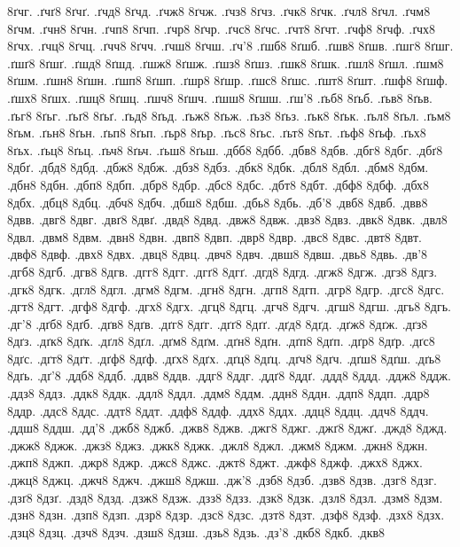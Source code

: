 {8ґчг.
.ґчґ8
8ґчґ.
.ґчд8
8ґчд.
.ґчж8
8ґчж.
.ґчз8
8ґчз.
.ґчк8
8ґчк.
.ґчл8
8ґчл.
.ґчм8
8ґчм.
.ґчн8
8ґчн.
.ґчп8
8ґчп.
.ґчр8
8ґчр.
.ґчс8
8ґчс.
.ґчт8
8ґчт.
.ґчф8
8ґчф.
.ґчх8
8ґчх.
.ґчц8
8ґчц.
.ґчч8
8ґчч.
.ґчш8
8ґчш.
.ґч'8
.ґшб8
8ґшб.
.ґшв8
8ґшв.
.ґшг8
8ґшг.
.ґшґ8
8ґшґ.
.ґшд8
8ґшд.
.ґшж8
8ґшж.
.ґшз8
8ґшз.
.ґшк8
8ґшк.
.ґшл8
8ґшл.
.ґшм8
8ґшм.
.ґшн8
8ґшн.
.ґшп8
8ґшп.
.ґшр8
8ґшр.
.ґшс8
8ґшс.
.ґшт8
8ґшт.
.ґшф8
8ґшф.
.ґшх8
8ґшх.
.ґшц8
8ґшц.
.ґшч8
8ґшч.
.ґшш8
8ґшш.
.ґш'8
.ґьб8
8ґьб.
.ґьв8
8ґьв.
.ґьг8
8ґьг.
.ґьґ8
8ґьґ.
.ґьд8
8ґьд.
.ґьж8
8ґьж.
.ґьз8
8ґьз.
.ґьк8
8ґьк.
.ґьл8
8ґьл.
.ґьм8
8ґьм.
.ґьн8
8ґьн.
.ґьп8
8ґьп.
.ґьр8
8ґьр.
.ґьс8
8ґьс.
.ґьт8
8ґьт.
.ґьф8
8ґьф.
.ґьх8
8ґьх.
.ґьц8
8ґьц.
.ґьч8
8ґьч.
.ґьш8
8ґьш.
.дбб8
8дбб.
.дбв8
8дбв.
.дбг8
8дбг.
.дбґ8
8дбґ.
.дбд8
8дбд.
.дбж8
8дбж.
.дбз8
8дбз.
.дбк8
8дбк.
.дбл8
8дбл.
.дбм8
8дбм.
.дбн8
8дбн.
.дбп8
8дбп.
.дбр8
8дбр.
.дбс8
8дбс.
.дбт8
8дбт.
.дбф8
8дбф.
.дбх8
8дбх.
.дбц8
8дбц.
.дбч8
8дбч.
.дбш8
8дбш.
.дбь8
8дбь.
.дб'8
.двб8
8двб.
.двв8
8двв.
.двг8
8двг.
.двґ8
8двґ.
.двд8
8двд.
.двж8
8двж.
.двз8
8двз.
.двк8
8двк.
.двл8
8двл.
.двм8
8двм.
.двн8
8двн.
.двп8
8двп.
.двр8
8двр.
.двс8
8двс.
.двт8
8двт.
.двф8
8двф.
.двх8
8двх.
.двц8
8двц.
.двч8
8двч.
.двш8
8двш.
.двь8
8двь.
.дв'8
.дгб8
8дгб.
.дгв8
8дгв.
.дгг8
8дгг.
.дгґ8
8дгґ.
.дгд8
8дгд.
.дгж8
8дгж.
.дгз8
8дгз.
.дгк8
8дгк.
.дгл8
8дгл.
.дгм8
8дгм.
.дгн8
8дгн.
.дгп8
8дгп.
.дгр8
8дгр.
.дгс8
8дгс.
.дгт8
8дгт.
.дгф8
8дгф.
.дгх8
8дгх.
.дгц8
8дгц.
.дгч8
8дгч.
.дгш8
8дгш.
.дгь8
8дгь.
.дг'8
.дґб8
8дґб.
.дґв8
8дґв.
.дґг8
8дґг.
.дґґ8
8дґґ.
.дґд8
8дґд.
.дґж8
8дґж.
.дґз8
8дґз.
.дґк8
8дґк.
.дґл8
8дґл.
.дґм8
8дґм.
.дґн8
8дґн.
.дґп8
8дґп.
.дґр8
8дґр.
.дґс8
8дґс.
.дґт8
8дґт.
.дґф8
8дґф.
.дґх8
8дґх.
.дґц8
8дґц.
.дґч8
8дґч.
.дґш8
8дґш.
.дґь8
8дґь.
.дґ'8
.ддб8
8ддб.
.ддв8
8ддв.
.ддг8
8ддг.
.ддґ8
8ддґ.
.ддд8
8ддд.
.ддж8
8ддж.
.ддз8
8ддз.
.ддк8
8ддк.
.ддл8
8ддл.
.ддм8
8ддм.
.ддн8
8ддн.
.ддп8
8ддп.
.ддр8
8ддр.
.ддс8
8ддс.
.ддт8
8ддт.
.ддф8
8ддф.
.ддх8
8ддх.
.ддц8
8ддц.
.ддч8
8ддч.
.ддш8
8ддш.
.дд'8
.джб8
8джб.
.джв8
8джв.
.джг8
8джг.
.джґ8
8джґ.
.джд8
8джд.
.джж8
8джж.
.джз8
8джз.
.джк8
8джк.
.джл8
8джл.
.джм8
8джм.
.джн8
8джн.
.джп8
8джп.
.джр8
8джр.
.джс8
8джс.
.джт8
8джт.
.джф8
8джф.
.джх8
8джх.
.джц8
8джц.
.джч8
8джч.
.джш8
8джш.
.дж'8
.дзб8
8дзб.
.дзв8
8дзв.
.дзг8
8дзг.
.дзґ8
8дзґ.
.дзд8
8дзд.
.дзж8
8дзж.
.дзз8
8дзз.
.дзк8
8дзк.
.дзл8
8дзл.
.дзм8
8дзм.
.дзн8
8дзн.
.дзп8
8дзп.
.дзр8
8дзр.
.дзс8
8дзс.
.дзт8
8дзт.
.дзф8
8дзф.
.дзх8
8дзх.
.дзц8
8дзц.
.дзч8
8дзч.
.дзш8
8дзш.
.дзь8
8дзь.
.дз'8
.дкб8
8дкб.
.дкв8
}
